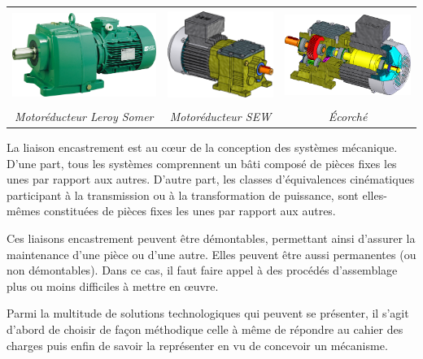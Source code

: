 \documentclass[11pt,oneside]{article}
\begin{document}
\begin{center}
\begin{tabular}{ccc}
\includegraphics[height=3cm]{png/motored1} &
\includegraphics[height=3cm]{png/motored2} &
\includegraphics[height=3cm]{png/motored3} \\
\textit{Motoréducteur Leroy Somer \cite{ls}} & \textit{Motoréducteur SEW}&\textit{Écorché}\\
\end{tabular}
\end{center}

La liaison encastrement est au c\oe{}ur de la conception des systèmes mécanique. D'une part, tous les systèmes comprennent un bâti composé de pièces fixes les unes par rapport aux autres. D'autre part, les classes d'équivalences cinématiques participant à la transmission ou à la transformation de puissance, sont elles-mêmes constituées de pièces fixes les unes par rapport aux autres. 

Ces liaisons encastrement peuvent être démontables, permettant ainsi d'assurer la maintenance d'une pièce ou d'une autre. Elles peuvent être aussi permanentes (ou non démontables). Dans ce cas, il faut faire appel à des procédés d'assemblage plus ou moins difficiles à mettre en \oe{}uvre. 

Parmi la multitude de solutions technologiques qui peuvent se présenter, il s'agit d'abord de choisir de façon méthodique celle à même de répondre au cahier des charges puis enfin de savoir la représenter en vu de concevoir un mécanisme.
\end{document}
